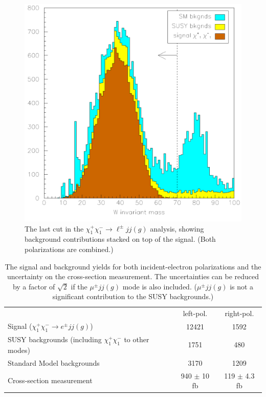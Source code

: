 \documentclass[12pt]{article}
\begin{document}
\begin{figure}[p]
  \begin{center}
    \includegraphics[width=0.7\linewidth]{allnew_8}
  \end{center}

  \caption{The last cut in the $\chi_1^+\chi_1^- \to \ell^\pm jj(g)$
    analysis, showing background contributions stacked on top of the
    signal.  (Both polarizations are combined.) \label{jimp_cutplot}}
\end{figure}

\begin{table}[p]
  \begin{center}
    \begin{tabular}{l c c}
      & left-pol. & right-pol. \\
      Signal ($\chi_1^+\chi_1^- \to e^\pm jj(g)$) & 12421 & 1592 \\
      SUSY backgrounds (including $\chi_1^+\chi_1^-$ to other modes) & 1751 & 480 \\
      Standard Model backgrounds & 3170 & 1209 \\\hline
      Cross-section measurement & 940 $\pm$ 10 fb & 119 $\pm$ 4.3 fb
    \end{tabular}
  \end{center}

  \caption{The signal and background yields for both incident-electron
    polarizations and the uncertainty on the cross-section
    measurement.  The uncertainties can be reduced by a factor of
    $\sqrt{2}$ if the $\mu^\pm jj(g)$ mode is also included.
    ($\mu^\pm jj(g)$ is not a significant contribution to the SUSY
    backgrounds.) \label{jimp_table}}
\end{table}
\end{document}
